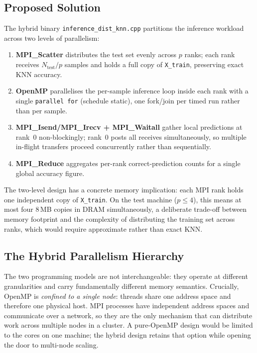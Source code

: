 \documentclass[12pt,a4paper]{article}
\begin{document}
\subsection{Proposed Solution}

The hybrid binary \texttt{inference\_dist\_knn.cpp} partitions the inference
workload across two levels of parallelism:

\begin{enumerate}
  \item \textbf{MPI\_Scatter} distributes the test set evenly across $p$
        ranks; each rank receives $N_\text{test}/p$ samples and holds a
        full copy of \texttt{X\_train}, preserving exact KNN accuracy.
  \item \textbf{OpenMP} parallelises the per-sample inference loop inside
        each rank with a single \texttt{parallel for} (schedule static),
        one fork/join per timed run rather than per sample.
  \item \textbf{MPI\_Isend/MPI\_Irecv + MPI\_Waitall} gather local
        predictions at rank~0 non-blockingly; rank~0 posts all receives
        simultaneously, so multiple in-flight transfers proceed concurrently
        rather than sequentially.
  \item \textbf{MPI\_Reduce} aggregates per-rank correct-prediction counts
        for a single global accuracy figure.
\end{enumerate}

The two-level design has a concrete memory implication: each MPI rank holds
one independent copy of \texttt{X\_train}. On the test machine ($p \leq 4$),
this means at most four 8\,MB copies in DRAM simultaneously, a deliberate
trade-off between memory footprint and the complexity of distributing the
training set across ranks, which would require approximate rather than exact
KNN.

\subsection{The Hybrid Parallelism Hierarchy}
\label{sec:hybrid}

The two programming models are not interchangeable: they operate at
different granularities and carry fundamentally different memory semantics.
Crucially, OpenMP is \emph{confined to a single node}: threads share
one address space and therefore one physical host. MPI processes have
independent address spaces and communicate over a network, so they are
the only mechanism that can distribute work across multiple nodes in a
cluster. A pure-OpenMP design would be limited to the cores on one
machine; the hybrid design retains that option while opening the door
to multi-node scaling.
\end{document}
